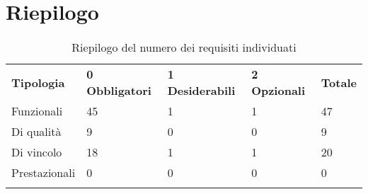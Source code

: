 \documentclass[AnalisiDeiRequisiti.tex]{subfiles}
\begin{document}
\section{Riepilogo}

\label{table:Riepilogo del numero dei requisiti individuati}
\renewcommand*{\arraystretch}{1.2}
\begin{longtable}[H]{p{2.8cm}p{2.9cm}p{2.9cm}p{2.9cm}p{1.5cm}}
	\rowcolor{CHeader}
	\color{CHeaderText} \textbf{Tipologia} & \color{CHeaderText} \textbf{0 Obbligatori} & \color{CHeaderText} \textbf{1 Desiderabili} & \color{CHeaderText} \textbf{2 Opzionali} & \color{CHeaderText} \textbf{Totale} \\  
	Funzionali & 45 & 1 & 1 & 47 \\  
	Di qualità & 9 & 0 & 0 & 9 \\  
	Di vincolo & 18 & 1 & 1 & 20 \\  
	Prestazionali & 0 & 0 & 0 & 0 \\  
	\hiderowcolors
	\caption{Riepilogo del numero dei requisiti individuati}
\end{longtable}
\end{document}
